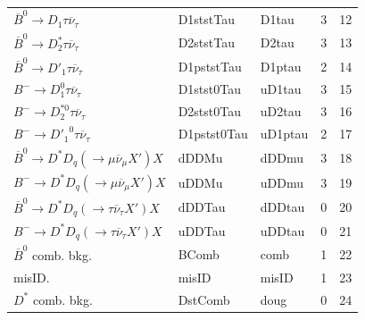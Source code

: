 \begin{table}[htb]
\begin{tabular}{lllrr}
 $\overline{B}^0 \rightarrow D_1 \tau \overline{\nu}_\tau$                         & D1ststTau                & D1tau             &            3 &      12 \\
 $\overline{B}^0 \rightarrow D^*_2 \tau \overline{\nu}_\tau$                       & D2ststTau                & D2tau             &            3 &      13 \\
 $\overline{B}^0 \rightarrow D'_1 \tau \overline{\nu}_\tau$                        & D1pststTau               & D1ptau            &            2 &      14 \\
 $B^- \rightarrow D_1^0 \tau \overline{\nu}_\tau$                                  & D1stst0Tau               & uD1tau            &            3 &      15 \\
 $B^- \rightarrow D_2^{*0} \tau \overline{\nu}_\tau$                               & D2stst0Tau               & uD2tau            &            3 &      16 \\
 $B^- \rightarrow {D'_1}^0 \tau \overline{\nu}_\tau$                               & D1pstst0Tau              & uD1ptau           &            2 &      17 \\
 $\overline{B}^0 \rightarrow D^* D_q (\rightarrow \mu \overline{\nu}_\mu X') X$    & dDDMu                    & dDDmu             &            3 &      18 \\
 $B^- \rightarrow D^* D_q (\rightarrow \mu \overline{\nu}_\mu X') X$               & uDDMu                    & uDDmu             &            3 &      19 \\
 $\overline{B}^0 \rightarrow D^* D_q (\rightarrow \tau \overline{\nu}_\tau X') X$  & dDDTau                   & dDDtau            &            0 &      20 \\
 $B^- \rightarrow D^* D_q (\rightarrow \tau \overline{\nu}_\tau X') X$             & uDDTau                   & uDDtau            &            0 &      21 \\
 $\overline{B}^0$ comb. bkg.                                                       & BComb                    & comb              &            1 &      22 \\
 misID.                                                                            & misID                    & misID             &            1 &      23 \\
 $D^*$ comb. bkg.                                                                  & DstComb                  & doug              &            0 &      24 \\
\bottomrule
\end{tabular}
\end{table}


